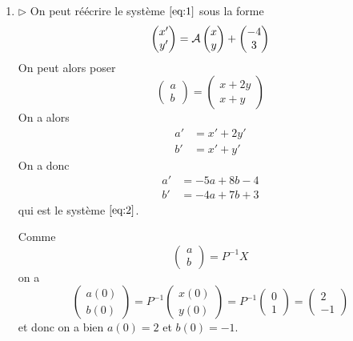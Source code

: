 {\begin{td-sol}[]
\begin{enumerate}
			\item \(\triangleright\) On peut réécrire le système \(\eqref{eq:1}\) sous la forme
			\begin{equation*}
				\begin{pmatrix}
					x'\\
					y'
				\end{pmatrix}
				=\cal A
				\begin{pmatrix}
					x\\
					y
				\end{pmatrix}
				+\begin{pmatrix}
					-4\\
					3
				\end{pmatrix}
			\end{equation*}
			On peut alors poser
			\begin{equation*}
				\begin{pmatrix}
					a\\
					b
				\end{pmatrix}
				=\begin{pmatrix}
					x+2y\\
					x+y
				\end{pmatrix}
			\end{equation*}
			On a alors
			\begin{equation*}
				\begin{aligned}
					a'&=x'+2y'\\
					b'&=x'+y'
				\end{aligned}
			\end{equation*}
			On a donc
			\begin{equation*}
				\begin{aligned}
					a'&=-5a+8b-4\\
					b'&=-4a+7b+3
				\end{aligned}
			\end{equation*}
			qui est le système \(\eqref{eq:2}\).

			Comme 
			\begin{equation*}
				\begin{pmatrix}
					a\\
					b
				\end{pmatrix}
				=P^{-1}X
			\end{equation*}
			on a
			\begin{equation*}
				\begin{pmatrix}
					a(0)\\
					b(0)
				\end{pmatrix}
				=P^{-1}
				\begin{pmatrix}
					x(0)\\
					y(0)
				\end{pmatrix}
				=P^{-1}
				\begin{pmatrix}
					0\\
					1
				\end{pmatrix}
				=
				\begin{pmatrix}
					2\\
					-1
				\end{pmatrix}
			\end{equation*}
			et donc on a bien \(a(0)=2\) et \(b(0)=-1\).


\end{enumerate}
\end{td-sol}}
